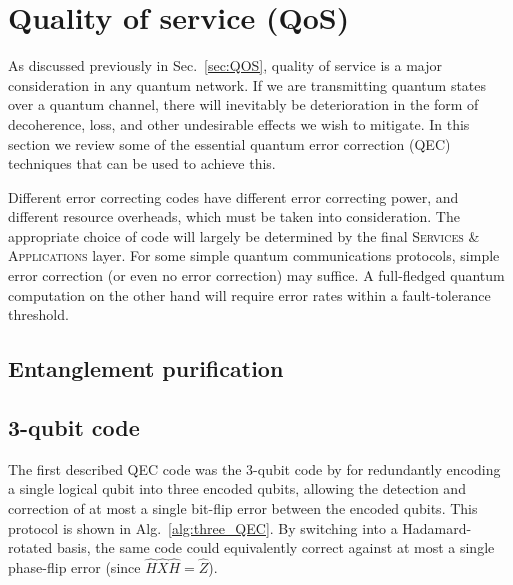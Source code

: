 %
%

\section{Quality of service (QoS)}\label{sec:QOS_chap}


As discussed previously in Sec.~\ref{sec:QOS}, quality of service is a major consideration in any quantum network. If we are transmitting quantum states over a quantum channel, there will inevitably be deterioration in the form of decoherence, loss, and other undesirable effects we wish to mitigate. In this section we review some of the essential quantum error correction (QEC) techniques that can be used to achieve this.

Different error correcting codes have different error correcting power, and different resource overheads, which must be taken into consideration. The appropriate choice of code will largely be determined by the final \textsc{Services \& Applications} layer. For some simple quantum communications protocols, simple error correction (or even no error correction) may suffice. A full-fledged quantum computation on the other hand will require error rates within a fault-tolerance threshold.


%
%

\subsection{Entanglement purification}


%
%

\subsection{3-qubit code}


The first described QEC code was the 3-qubit code by \cite{bib:Shor95} for redundantly encoding a single logical qubit into three encoded qubits, allowing the detection and correction of at most a single bit-flip error between the encoded qubits. This protocol is shown in Alg.~\ref{alg:three_QEC}. By switching into a Hadamard-rotated basis, the same code could equivalently correct against at most a single phase-flip error (since \mbox{$\hat{H}\hat{X}\hat{H}=\hat{Z}$}).

